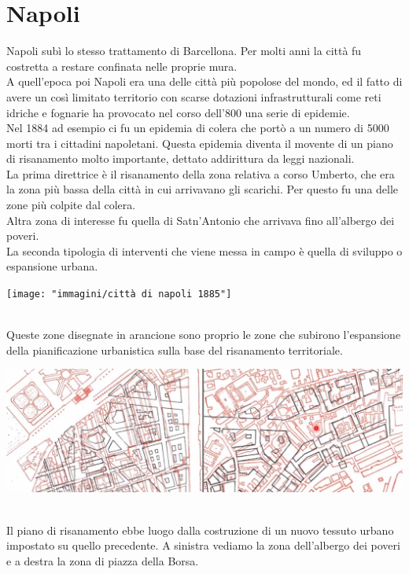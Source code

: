 \documentclass[a4paper,12pt, oneside]{book}
\begin{document}
  \section{Napoli}
  Napoli subì lo stesso trattamento di Barcellona. Per molti anni la città fu costretta a restare confinata nelle proprie mura.\\
  A quell'epoca poi Napoli era una delle città più popolose del mondo, ed il fatto di avere un così limitato territorio con scarse dotazioni infrastrutturali come reti idriche e fognarie ha provocato nel corso dell'800 una serie di epidemie.\\
  Nel 1884 ad esempio ci fu un epidemia di colera che portò a un numero di 5000 morti tra i cittadini napoletani. Questa epidemia diventa il movente di un piano di risanamento molto importante, dettato addirittura da leggi nazionali.\\
  La prima direttrice è il risanamento della zona relativa a corso Umberto, che era la zona più bassa della città in cui arrivavano gli scarichi. Per questo fu una delle zone più colpite dal colera.\\
  Altra zona di interesse fu quella di Satn'Antonio che arrivava fino all'albergo dei poveri.\\
  La seconda tipologia di interventi che viene messa in campo è quella di sviluppo o espansione urbana.\\
  \begin{center}
  	\texttt{[image: "immagini/città di napoli 1885"]}
  	\label{fig:città di napoli 1885}
  \end{center}
  \leavevmode\\
  Queste zone disegnate in arancione sono proprio le zone che subirono l'espansione della pianificazione urbanistica sulla base del risanamento territoriale.\\
  \begin{center}
  	\includegraphics[width=0.6\linewidth]{"immagini/piano regolatore napoli 1885"}
  	\label{fig:piano regolatore napoli 1885}
  \end{center}
  \leavevmode\\
  Il piano di risanamento ebbe luogo dalla costruzione di un nuovo tessuto urbano impostato su quello precedente. A sinistra vediamo la zona dell'albergo dei poveri e a destra la zona di piazza della Borsa.\\
\end{document}
